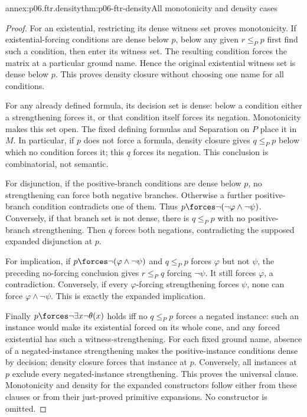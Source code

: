 \begin{annexitem}{annex:p06.ftr.density}{thm:p06-ftr-density}{All monotonicity and density cases}
\begin{proof}
For an existential, restricting its dense witness set proves monotonicity.
If existential-forcing conditions are dense below \(p\), below any given
\(r\leq_P p\) first find such a condition, then enter its witness set.
The resulting condition forces the matrix at a particular ground name.
Hence the original existential witness set is dense below \(p\).
This proves density closure without choosing one name for all conditions.

For any already defined formula, its decision set is dense: below a
condition either a strengthening forces it, or that condition itself
forces its negation. Monotonicity makes this set open. The fixed defining
formulas and Separation on \(P\) place it in \(M\). In particular,
if \(p\) does not force a formula, density closure gives
\(q\leq_P p\) below which no condition forces it; this \(q\) forces
its negation. This conclusion is combinatorial, not semantic.

For disjunction, if the positive-branch conditions are dense below \(p\),
no strengthening can force both negative branches. Otherwise a further
positive-branch condition contradicts one of them. Thus
\(p\forces\neg(\neg\varphi\land\neg\psi)\).
Conversely, if that branch set is not dense, there is \(q\leq_P p\)
with no positive-branch strengthening. Then \(q\) forces both negations,
contradicting the supposed expanded disjunction at \(p\).

For implication, if \(p\forces\neg(\varphi\land\neg\psi)\) and
\(q\leq_P p\) forces \(\varphi\) but not \(\psi\), the preceding
no-forcing conclusion gives \(r\leq_P q\) forcing \(\neg\psi\).
It still forces \(\varphi\), a contradiction. Conversely, if every
\(\varphi\)-forcing strengthening forces \(\psi\), none can force
\(\varphi\land\neg\psi\). This is exactly the expanded implication.

Finally \(p\forces\neg\exists x\neg\theta(x)\) holds iff no
\(q\leq_P p\) forces a negated instance: such an instance would make
its existential forced on its whole cone, and any forced existential
has such a witness-strengthening. For each fixed ground name, absence
of a negated-instance strengthening makes the positive-instance conditions
dense by decision; density closure forces that instance at \(p\).
Conversely, all instances at \(p\) exclude every negated-instance
strengthening. This proves the universal clause. Monotonicity and
density for the expanded constructors follow either from these clauses
or from their just-proved primitive expansions. No constructor is omitted.
\end{proof}
\end{annexitem}

